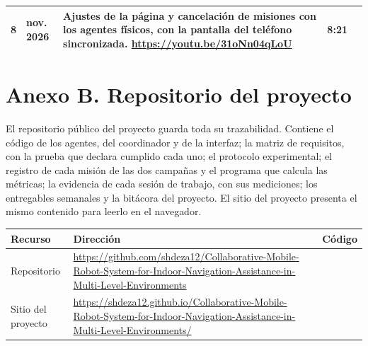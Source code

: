 \begin{table}[H]
\begin{tabular}{@{}c >{\raggedright\arraybackslash}p{} p{} c c@{}}
    8 & 1 nov. 2026 & Ajustes de la página y cancelación de misiones con los agentes físicos, con la pantalla del teléfono sincronizada. \newline \url{https://youtu.be/31oNn04qLoU} & 8:21 & \raisebox{-0.85\height}{\qrcode[height=1.25cm]{https://youtu.be/31oNn04qLoU}} \\ \bottomrule
  \end{tabular}
\end{table}

\chapter*{Anexo B. Repositorio del proyecto}

El repositorio público del proyecto guarda toda su trazabilidad. Contiene el
código de los agentes, del coordinador y de la interfaz; la matriz de requisitos,
con la prueba que declara cumplido cada uno; el protocolo experimental; el
registro de cada misión de las dos campañas y el programa que calcula las
métricas; la evidencia de cada sesión de trabajo, con sus mediciones; los
entregables semanales y la bitácora del proyecto. El sitio del proyecto presenta
el mismo contenido para leerlo en el navegador.

\begin{table}[H]
  \centering\small
  \renewcommand{\arraystretch}{1.3}
  \begin{tabular}{@{}p{} p{} c@{}}
    \toprule
    \textbf{Recurso} & \textbf{Dirección} & \textbf{Código} \\ \midrule
    Repositorio & \url{https://github.com/shdeza12/Collaborative-Mobile-Robot-System-for-Indoor-Navigation-Assistance-in-Multi-Level-Environments} & \raisebox{-0.85\height}{\qrcode[height=2cm]{https://github.com/shdeza12/Collaborative-Mobile-Robot-System-for-Indoor-Navigation-Assistance-in-Multi-Level-Environments}} \\ \addlinespace
    Sitio del proyecto & \url{https://shdeza12.github.io/Collaborative-Mobile-Robot-System-for-Indoor-Navigation-Assistance-in-Multi-Level-Environments/} & \raisebox{-0.85\height}{\qrcode[height=2cm]{https://shdeza12.github.io/Collaborative-Mobile-Robot-System-for-Indoor-Navigation-Assistance-in-Multi-Level-Environments/}} \\ \bottomrule
  \end{tabular}
\end{table}
